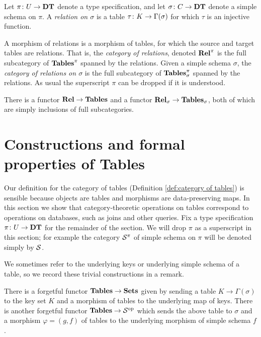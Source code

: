 \documentclass{amsart}
\def\DT{{\bf DT}}
\def\Tables{{\bf Tables}}
\def\Rel{{\bf Rel}}
\begin{document}
\begin{definition}\label{def:relational table}

Let $\pi\taking U\to\DT$ denote a type specification, and let $\sigma\taking C\to\DT$ denote a simple schema on $\pi$.  A {\em relation on $\sigma$} is a table $\tau\colon K\rightarrow\Gamma(\sigma)$ for which $\tau$ is an injective function.  

A morphism of relations is a morphism of tables, for which the source and target tables are relations.  That is, the {\em category of relations}, denoted $\Rel^\pi$ is the full subcategory of $\Tables^\pi$ spanned by the relations.  Given a simple schema $\sigma$, the {\em category of relations on $\sigma$} is the full subcategory of $\Tables^\pi_\sigma$ spanned by the relations.  As usual the superscript $\pi$ can be dropped if it is understood.

There is a functor $\Rel\to\Tables$ and a functor $\Rel_\sigma\to\Tables_\sigma$, both of which are simply inclusions of full subcategories.

\end{definition}

\section{Constructions and formal properties of Tables}\label{sec:constructions for tables}

\setcounter{subsection}{1}

Our definition for the category of tables (Definition \ref{def:category of tables}) is sensible because objects are tables and morphisms are data-preserving maps.  In this section we show that category-theoretic operations on tables correspond to operations on databases, such as joins and other queries.  Fix a type specification $\pi\taking U\to\DT$ for the remainder of the section.  We will drop $\pi$ as a superscript in this section; for example the category $\mathcal{S}^\pi$ of simple schema on $\pi$ will be denoted simply by $\mathcal{S}$.

We sometimes refer to the underlying keys or underlying simple schema of a table, so we record these trivial constructions in a remark.

\begin{remark}\label{rem:forget}

There is a forgetful functor $\Tables\to\Sets$ given by sending a table $K\to\Gamma(\sigma)$ to the key set $K$ and a morphism of tables to the underlying map of keys.  There is another forgetful functor $\Tables\to\mcS\op$ which sends the above table to $\sigma$ and a morphism $\varphi=(g,f)$ of tables to the underlying morphism of simple schema $f$.

\end{remark}
\end{document}

